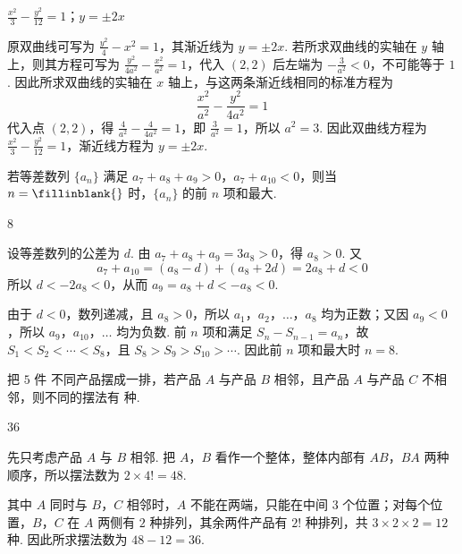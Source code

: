 \begin{answer}
\(\frac{x^{2}}{3}-\frac{y^{2}}{12}=1\)；\(y=\pm2x\)
\end{answer}

\begin{solution}
原双曲线可写为 \(\frac{y^{2}}{4}-x^{2}=1\)，其渐近线为 \(y=\pm2x\). 若所求双曲线的实轴在 \(y\) 轴上，则其方程可写为 \(\frac{y^{2}}{4a^{2}}-\frac{x^{2}}{a^{2}}=1\)，代入 \((2,2)\) 后左端为 \(-\frac{3}{a^{2}}<0\)，不可能等于 \(1\). 因此所求双曲线的实轴在 \(x\) 轴上，与这两条渐近线相同的标准方程为
\[
\frac{x^{2}}{a^{2}}-\frac{y^{2}}{4a^{2}}=1
\]
代入点 \((2,2)\)，得 \(\frac4{a^{2}}-\frac4{4a^{2}}=1\)，即 \(\frac3{a^{2}}=1\)，所以 \(a^{2}=3\). 因此双曲线方程为 \(\frac{x^{2}}3-\frac{y^{2}}{12}=1\)，渐近线方程为 \(y=\pm2x\).
\end{solution}

\begin{problem}
若等差数列 \(\{a_{n}\}\) 满足 \(a_{7} + a_{8} + a_{9} > 0\)，\(a_{7} + a_{10} < 0\)，则当 \(n =\fillinblank{}\) 时，\(\{a_{n}\}\) 的前 \(n\) 项和最大.
\end{problem}

\begin{answer}
\(8\)
\end{answer}

\begin{solution}
设等差数列的公差为 \(d\). 由 \(a_{7}+a_{8}+a_{9}=3a_{8}>0\)，得 \(a_{8}>0\). 又
\[
a_{7}+a_{10}=(a_{8}-d)+(a_{8}+2d)=2a_{8}+d<0
\]
所以 \(d<-2a_{8}<0\)，从而 \(a_{9}=a_{8}+d<-a_{8}<0\).

由于 \(d<0\)，数列递减，且 \(a_{8}>0\)，所以 \(a_{1}\)，\(a_{2}\)，\(\ldots\)，\(a_{8}\) 均为正数；又因 \(a_{9}<0\)，所以 \(a_{9}\)，\(a_{10}\)，\(\ldots\) 均为负数. 前 \(n\) 项和满足 \(S_{n}-S_{n-1}=a_{n}\)，故 \(S_{1}<S_{2}<\cdots<S_{8}\)，且 \(S_{8}>S_{9}>S_{10}>\cdots\). 因此前 \(n\) 项和最大时 \(n=8\).
\end{solution}

\begin{problem}
把 \(5\text{ 件}\) 不同产品摆成一排，若产品 \(A\) 与产品 \(B\) 相邻，且产品 \(A\) 与产品 \(C\) 不相邻，则不同的摆法有\fillinblank{} 种.
\end{problem}

\begin{answer}
\(36\)
\end{answer}

\begin{solution}
先只考虑产品 \(A\) 与 \(B\) 相邻. 把 \(A\)，\(B\) 看作一个整体，整体内部有 \(AB\)，\(BA\) 两种顺序，所以摆法数为 \(2\times4!=48\).

其中 \(A\) 同时与 \(B\)，\(C\) 相邻时，\(A\) 不能在两端，只能在中间 \(3\) 个位置；对每个位置，\(B\)，\(C\) 在 \(A\) 两侧有 \(2\) 种排列，其余两件产品有 \(2!\) 种排列，共 \(3\times2\times2=12\) 种. 因此所求摆法数为 \(48-12=36\).
\end{solution}

